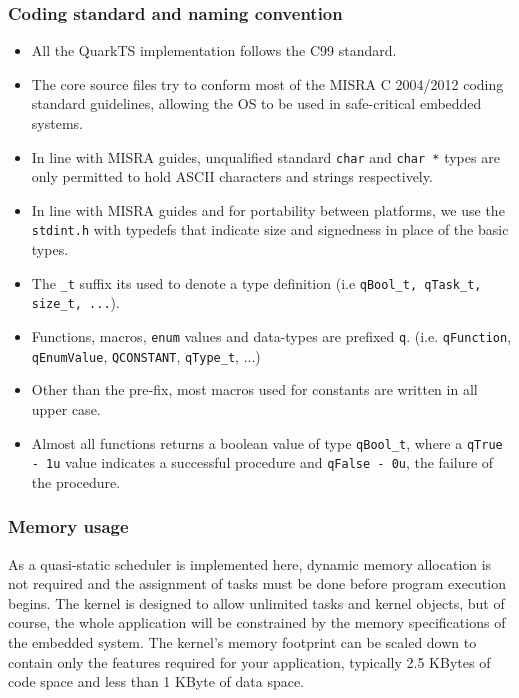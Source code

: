 \subsubsection{Coding standard and naming convention}

\begin{itemize}
    \item All the QuarkTS implementation follows the C99 standard.
    \item The core source files try to conform most of the MISRA C 2004/2012 coding standard guidelines, allowing the OS to be used in safe-critical embedded systems. 
    \item In line with MISRA guides, unqualified standard \lstinline{char} and \lstinline{char *} types are only permitted to hold ASCII characters and strings respectively.
    \item In line with MISRA guides and for portability between platforms, we use the \lstinline{stdint.h} with typedefs that indicate size and signedness in place of the basic types.
    \item The \lstinline{_t} suffix its used to denote a type definition (i.e \lstinline{qBool_t, qTask_t, size_t, ...}).   
    \item Functions, macros, \lstinline{enum} values and data-types are prefixed \lstinline{q}. (i.e. \lstinline{qFunction}, \lstinline{qEnumValue}, \lstinline{QCONSTANT}, \lstinline{qType_t}, ...)
    \item Other than the pre-fix, most macros used for constants are written in all upper case.
    \item Almost all functions returns a boolean value of type \lstinline{qBool_t}, where a \lstinline{qTrue - 1u}  value indicates a successful procedure and \lstinline{qFalse - 0u}, the failure of the procedure.
\end{itemize}

\subsubsection{Memory usage}
As a quasi-static scheduler is implemented here, dynamic memory allocation is not required and the assignment of tasks must be done before program execution begins.
The kernel is designed to allow unlimited tasks and kernel objects, but of course, the whole application will be constrained by the memory specifications of the embedded system. 
The kernel's memory footprint can be scaled down to contain only the features required for your application, typically 2.5 KBytes of code space and less than 1 KByte of data space. 

